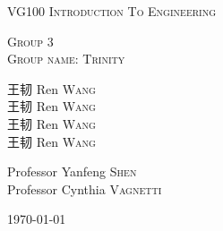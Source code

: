 
\begin{center}
\vspace*{0.7in}
\vspace*{0.7in}






\begin{center} 

{
\linespread{2}
\huge
\textsc{VG100 Introduction To Engineering} \\
}

\vspace*{0.7in}
\textsc{Group 3}\\
\textsc{Group name: Trinity}\\
\vspace*{0.7in}

{\selectfont 王韧} Ren \textsc{Wang} \\
{\selectfont 王韧} Ren \textsc{Wang} \\
{\selectfont 王韧} Ren \textsc{Wang} \\
{\selectfont 王韧} Ren \textsc{Wang} \\

\vspace*{0.7in}

Professor \phantom{iia}  Yanfeng \textsc{Shen} \phantom{i}\\
Professor \phantom{a} Cynthia \textsc{Vagnetti} 


{\today}


\end{center}



\end{center}
\newpage
